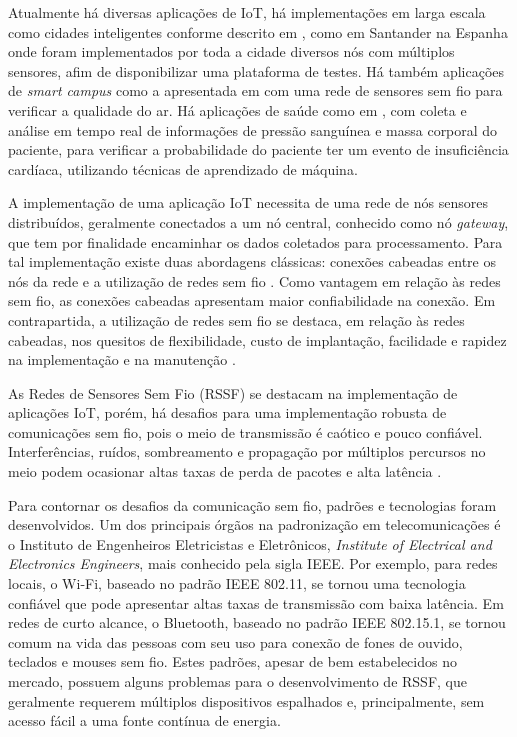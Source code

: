Atualmente há diversas aplicações de IoT, há implementações em larga escala como cidades inteligentes conforme descrito em \cite{sotres2017practical}, como em Santander na Espanha onde foram implementados por toda a cidade diversos nós com múltiplos sensores, afim de disponibilizar uma plataforma de testes. Há também aplicações de \emph{smart campus} como a apresentada em \cite{wang2017performance} com uma rede de sensores sem fio para verificar a qualidade do ar. Há aplicações de saúde como em \cite{zhang2015remote}, com coleta e análise em tempo real de informações de pressão sanguínea e massa corporal do paciente, para verificar a probabilidade do paciente ter um evento de insuficiência cardíaca, utilizando técnicas de aprendizado de máquina.


A implementação de uma aplicação IoT necessita de uma rede de nós sensores distribuídos, geralmente conectados a um nó central, conhecido como nó \emph{gateway}, que tem por finalidade encaminhar os dados coletados para processamento. Para tal implementação existe duas abordagens clássicas: conexões cabeadas entre os nós da rede e a utilização de redes sem fio \cite{gomes2017estimaccao}. Como vantagem em relação às redes sem fio, as conexões cabeadas apresentam maior confiabilidade na conexão. Em contrapartida, a utilização de redes sem fio se destaca, em relação às redes cabeadas, nos quesitos de flexibilidade, custo de implantação, facilidade e rapidez na implementação e na manutenção \cite{gungor2009industrial}.

As Redes de Sensores Sem Fio (RSSF) se destacam na implementação de aplicações IoT, porém, há desafios para uma implementação robusta de comunicações sem fio, pois o meio de transmissão é caótico e pouco confiável. Interferências, ruídos, sombreamento e propagação por múltiplos percursos no meio podem ocasionar altas taxas de perda de pacotes e alta latência \cite{gomes2017estimaccao}.

Para contornar os desafios da comunicação sem fio, padrões e tecnologias foram desenvolvidos. Um dos principais órgãos na padronização em telecomunicações é o Instituto de Engenheiros Eletricistas e Eletrônicos, \emph{Institute of Electrical and Electronics Engineers}, mais conhecido pela sigla IEEE. Por exemplo, para redes locais, o Wi-Fi, baseado no padrão IEEE 802.11, se tornou uma tecnologia confiável que pode apresentar altas taxas de transmissão com baixa latência. Em redes de curto alcance, o Bluetooth, baseado no padrão IEEE 802.15.1, se tornou comum na vida das pessoas com seu uso para conexão de fones de ouvido, teclados e mouses sem fio. Estes padrões, apesar de bem estabelecidos no mercado, possuem alguns problemas para o desenvolvimento de RSSF, que geralmente requerem múltiplos dispositivos espalhados e, principalmente, sem acesso fácil a uma fonte contínua de energia.

